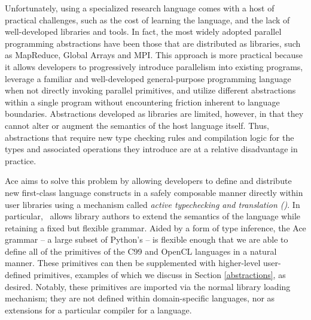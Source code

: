 \documentclass[10pt, conference, compsocconf]{IEEEtran}
\begin{document}
Unfortunately, using a specialized research language comes with a host of practical challenges, such as the cost of learning the language, and the lack of well-developed libraries and tools. In fact, the most widely adopted parallel programming abstractions have been those that are distributed as libraries, such as MapReduce, Global Arrays and MPI. This approach is more practical because it allows developers to progressively introduce parallelism into existing programs, leverage a familiar and well-developed general-purpose programming language when not directly invoking parallel primitives, and utilize different abstractions within a single program without encountering friction inherent to language boundaries. Abstractions developed as libraries are limited, however, in that they cannot alter or augment the semantics of the host language itself. Thus, abstractions that require new type checking rules and compilation logic for the types and associated operations they introduce are at a relative disadvantage in practice.

Ace aims to solve this problem by allowing developers to define and distribute new first-class language constructs in a safely composable manner directly within user libraries using a mechanism called {\em active typechecking and translation (\ATT)}. In particular, \ATT~allows library authors to extend the semantics of the  language while retaining a fixed but flexible grammar. Aided by a form of type inference, the Ace grammar -- a large subset of Python's -- is flexible enough that we are able to define all of the primitives of the C99 and OpenCL languages in a natural manner. These primitives can then be supplemented with higher-level user-defined primitives, examples of which we discuss in Section \ref{abstractions}, as desired. Notably, these primitives are imported via the normal library loading mechanism; they are not defined within domain-specific languages, nor as extensions for a particular compiler for a language.

\end{document}
